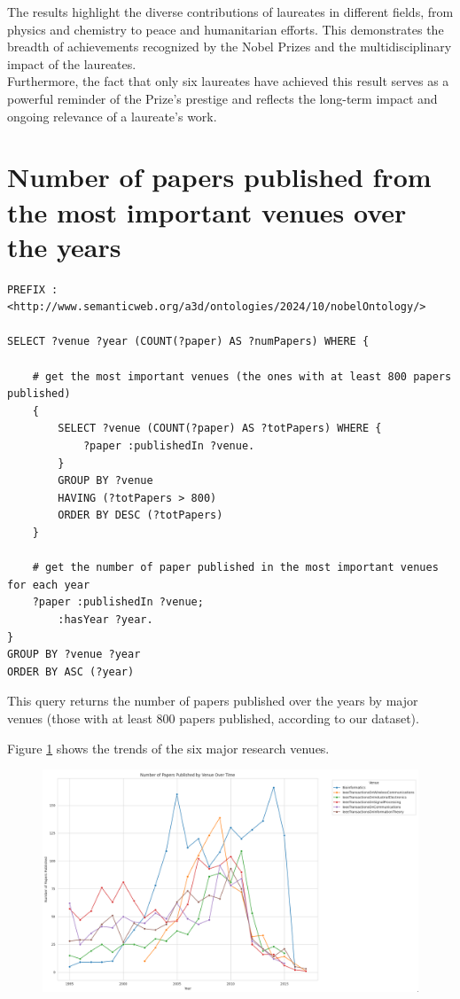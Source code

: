\documentclass{article}
\begin{document}
The results highlight the diverse contributions of laureates in different fields, from physics and chemistry to peace and humanitarian efforts. This demonstrates the breadth of achievements recognized by the Nobel Prizes and the multidisciplinary impact of the laureates. \\
Furthermore, the fact that only six laureates have achieved this result serves as a powerful reminder of the Prize's prestige and reflects the long-term impact and ongoing relevance of a laureate’s work.



\section{Number of papers published from the most important venues over the years}

\begin{lstlisting}
PREFIX : <http://www.semanticweb.org/a3d/ontologies/2024/10/nobelOntology/>

SELECT ?venue ?year (COUNT(?paper) AS ?numPapers) WHERE {

    # get the most important venues (the ones with at least 800 papers published)
    {
        SELECT ?venue (COUNT(?paper) AS ?totPapers) WHERE {
            ?paper :publishedIn ?venue.
        }
        GROUP BY ?venue
        HAVING (?totPapers > 800)
        ORDER BY DESC (?totPapers)
    }

    # get the number of paper published in the most important venues for each year
    ?paper :publishedIn ?venue;
        :hasYear ?year.
}
GROUP BY ?venue ?year
ORDER BY ASC (?year)
\end{lstlisting}

This query returns the number of papers published over the years by major
venues (those with at least 800 papers published, according to our dataset).

Figure \ref{fig:papersPerVenue} shows the trends of the six major research venues.

\begin{figure}[H]
	\centering
	\label{fig:papersPerVenue}
	\includegraphics[width=\textwidth]{../queries/plots/papersPerVenue.png}
\end{figure}
\end{document}

